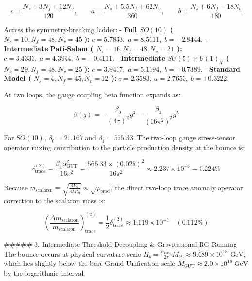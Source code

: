 \documentclass[11pt,a4paper]{article}
\theoremstyle{definition}
\theoremstyle{remark}
\begin{document}
\begin{equation}
c = \frac{N_s + 3 N_f + 12 N_v}{120}, \qquad a = \frac{N_s + 5.5 N_f + 62 N_v}{360}, \qquad b = \frac{N_s + 6 N_f - 18 N_v}{180}
\end{equation}


Across the symmetry-breaking ladder:
- \textbf{Full $SO(10)$ ( $N_s=10, N_f=48, N_v=45$ ):} $c = 5.7833, \; a = 8.5111, \; b = -2.8444$.
- \textbf{Intermediate Pati-Salam ( $N_s=16, N_f=48, N_v=21$ ):} $c = 3.4333, \; a = 4.3944, \; b = -0.4111$.
- \textbf{Intermediate $SU(5) \times U(1)_X$ ( $N_s=29, N_f=48, N_v=25$ ):} $c = 3.9417, \; a = 5.1194, \; b = -0.7389$.
- \textbf{Standard Model ( $N_s=4, N_f=45, N_v=12$ ):} $c = 2.3583, \; a = 2.7653, \; b = +0.3222$.

At two loops, the gauge coupling beta function expands as:


\begin{equation}
\beta(g) = - \frac{\beta_0}{(4\pi)^2} g^3 - \frac{\beta_1}{(16\pi^2)^2} g^5
\end{equation}


For $SO(10)$, $\beta_0 = 21.167$ and $\beta_1 = 565.33$. The two-loop gauge stress-tensor operator mixing contribution to the particle production density at the bounce is:


\begin{equation}
\delta_{\text{trace}}^{(2)} = \frac{\beta_1 \alpha_{\text{GUT}}^2}{16\pi^2} = \frac{565.33 \times (0.025)^2}{16\pi^2} \approx 2.237 \times 10^{-3} = 0.224\%
\end{equation}


Because $m_{\text{scalaron}} = \sqrt{\frac{4 V_0}{3 M_{\text{Pl}}^2}} \propto \sqrt{\rho_{\text{prod}}}$, the direct two-loop trace anomaly operator correction to the scalaron mass is:


\begin{equation}
\left(\frac{\Delta m_{\text{scalaron}}}{m_{\text{scalaron}}}\right)_{\text{trace}}^{(2)} = \frac{1}{2} \delta_{\text{trace}}^{(2)} \approx 1.119 \times 10^{-3} \quad (\mathbf{0.112\%})
\end{equation}


\#\#\#\#\# 3. Intermediate Threshold Decoupling \& Gravitational RG Running
The bounce occurs at physical curvature scale $H_b = \frac{\alpha_{\text{GUT}}}{2\pi} M_{\text{Pl}} \approx 9.689 \times 10^{15}\text{ GeV}$, which lies slightly below the bare Grand Unification scale $M_{\text{GUT}} \approx 2.0 \times 10^{16}\text{ GeV}$ by the logarithmic interval:
\end{document}
